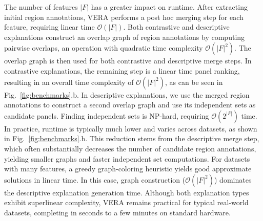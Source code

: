\documentclass[lettersize,journal]{IEEEtran}
\begin{document}
The number of features $|F|$ has a greater impact on runtime.
After extracting initial region annotations, VERA performs a post hoc merging step for each feature, requiring linear time $\mathcal{O}(|F|)$.
Both contrastive and descriptive explanations construct an overlap graph of region annotations by computing pairwise overlaps, an operation with quadratic time complexity $\mathcal{O}(|F|^2)$. The overlap graph is then used for both contrastive and descriptive merge steps.
In contrastive explanations, the remaining step is a linear time panel ranking, resulting in an overall time complexity of $\mathcal{O}(|F|^2)$, as can be seen in Fig.~\ref{fig:benchmarks}.b.
In descriptive explanations, we use the merged region annotations to construct a second overlap graph and use its independent sets as candidate panels. Finding independent sets is NP-hard, requiring $\mathcal{O}(2^{|F|})$ time.
In practice, runtime is typically much lower and varies across datasets, as shown in Fig.~\ref{fig:benchmarks}.b.
This reduction stems from the descriptive merge step, which often substantially decreases the number of candidate region annotations, yielding smaller graphs and faster independent set computations.
For datasets with many features, a greedy graph-coloring heuristic yields good approximate solutions in linear time. In this case, graph construction ($\mathcal{O}(|F|^2)$) dominates the descriptive explanation generation time.
Although both explanation types exhibit superlinear complexity, VERA remains practical for typical real-world datasets, completing in seconds to a few minutes on standard hardware. 
\end{document}
